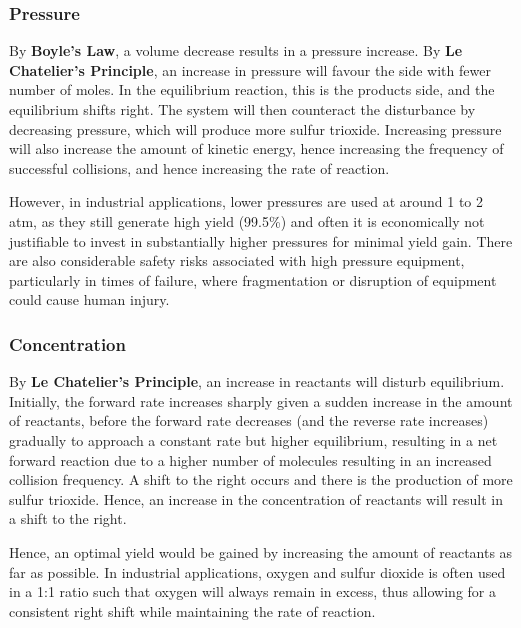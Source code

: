 \documentclass[12pt, a4paper]{article}
\begin{document}
\subsubsection{Pressure}

By \textbf{Boyle's Law}, a volume decrease results in a pressure increase. By \textbf{Le Chatelier's Principle}, an increase in pressure will favour the side with fewer number of moles. In the equilibrium reaction, this is the products side, and the equilibrium shifts right. The system will then counteract the disturbance by decreasing pressure, which will produce more sulfur trioxide. Increasing pressure will also increase the amount of kinetic energy, hence increasing the frequency of successful collisions, and hence increasing the rate of reaction.

However, in industrial applications, lower pressures are used at around 1 to 2 atm, as they still generate high yield (99.5\%) and often it is economically not justifiable to invest in substantially higher pressures for minimal yield gain. There are also considerable safety risks associated with high pressure equipment, particularly in times of failure, where fragmentation or disruption of equipment could cause human injury.






\subsubsection{Concentration}

By \textbf{Le Chatelier's Principle}, an increase in reactants will disturb equilibrium. Initially, the forward rate increases sharply given a sudden increase in the amount of reactants, before the forward rate decreases (and the reverse rate increases) gradually to approach a constant rate but higher equilibrium, resulting in a net forward reaction due to a higher number of molecules resulting in an increased collision frequency. A shift to the right occurs and there is the production of more sulfur trioxide. Hence, an increase in the concentration of reactants will result in a shift to the right. 

Hence, an optimal yield would be gained by increasing the amount of reactants as far as possible. In industrial applications, oxygen and sulfur dioxide is often used in a 1:1 ratio such that oxygen will always remain in excess, thus allowing for a consistent right shift while maintaining the rate of reaction.
\end{document}

